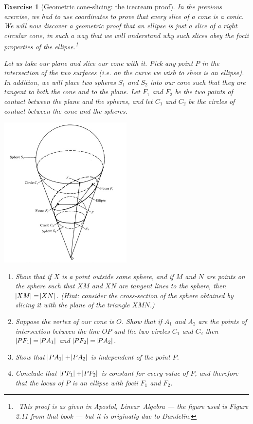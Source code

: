 \documentclass[a4paper,leqno,9pt]{article}
\theoremstyle{exercise}
\newtheorem{exercise}{Exercise}
\theoremstyle{plain}
\theoremstyle{definition}
\begin{document}
\begin{exercise}[Geometric cone-slicing: the icecream proof]
  In the previous exercise, we had to use coordinates to prove that every slice of a cone is a conic. We will now
  discover a geometric proof that an ellipse is just a slice of a right circular cone, in such a way that we will
  understand why such slices obey the focii properties of the ellipse.\footnote{~This proof is as given in Apostol, \textit{Linear~Algebra} ---
  the figure used is Figure 2.11 from that book --- but it is originally due to Dandelin.}

  Let us take our plane and slice our cone with it. Pick any point $ P $ in the intersection of the two surfaces (i.e.
  on the curve we wish to show is an ellipse). In addition, we will place two spheres $ S_1 $ and $ S_2 $ into our cone
  such that they are tangent to both the cone and to the plane. Let $ F_1 $ and $ F_2 $ be the two points of contact between
  the plane and the spheres, and let $ C_1 $ and $ C_2 $ be the circles of contact between the cone and the spheres.

  \begin{center}
    \includegraphics[width=0.5\textwidth]{apostol}
  \end{center}

  \begin{enumerate}
    \item Show that if $ X $ is a point outside some sphere, and if $ M $ and $ N $ are points on the sphere such that $ XM $
          and $ XN $ are tangent lines to the sphere, then $ \abs{XM} = \abs{XN} $. (Hint: consider the cross-section of the sphere
          obtained by slicing it with the plane of the triangle $ XMN $.)
    \item Suppose the vertex of our cone is $ O $. Show that if $ A_1 $ and $ A_2 $ are the points of intersection
          between the line $ OP $ and the two circles $ C_1 $ and $ C_2 $ then $ \abs{PF_1} = \abs{PA_1} $ and $ \abs{PF_2} = \abs{PA_2} $.
    \item Show that $ \abs{PA_1} + \abs{PA_2} $ is independent of the point $ P $.
    \item Conclude that $ \abs{PF_1} + \abs{PF_2} $ is constant for every value of $ P $, and therefore that the locus of $ P $
          is an ellipse with focii $ F_1 $ and $ F_2 $.
  \end{enumerate}
\end{exercise}
\end{document}
